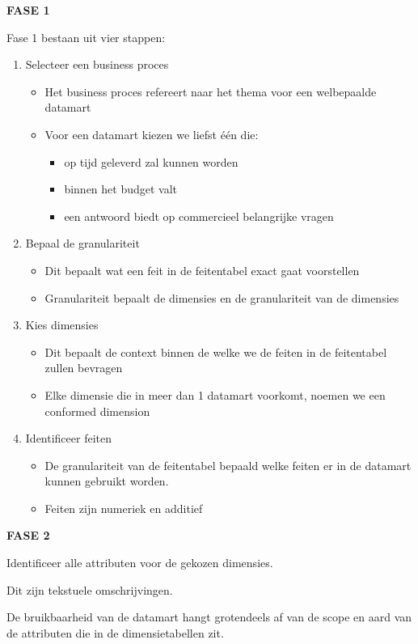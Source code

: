 \documentclass[a4paper,12pt]{article}
\begin{document}
\textbf{FASE 1}

Fase 1 bestaan uit vier stappen:
\begin{enumerate}
\item Selecteer een business proces
	\begin{itemize}
	\item Het business proces refereert naar het thema voor een welbepaalde datamart
	\item Voor een datamart kiezen we liefst één die:
		\begin{itemize}
		\item op tijd geleverd zal kunnen worden
		\item binnen het budget valt
		\item een antwoord biedt op commercieel belangrijke vragen
		\end{itemize}
	\end{itemize}
\item Bepaal de granulariteit
	\begin{itemize}
	\item Dit bepaalt wat een feit in de feitentabel exact gaat voorstellen
	\item Granulariteit bepaalt de dimensies en de granulariteit van de dimensies
	\end{itemize}
\item Kies dimensies
	\begin{itemize}
	\item Dit bepaalt de context binnen de welke we de feiten in de feitentabel zullen bevragen
	\item Elke dimensie die in meer dan 1 datamart voorkomt, noemen we een conformed dimension
	\end{itemize}
\item Identificeer feiten
	\begin{itemize}
	\item De granulariteit van de feitentabel bepaald welke feiten er in de datamart kunnen gebruikt worden.
	\item Feiten zijn numeriek en additief
	\end{itemize}
\end{enumerate}
\textbf{FASE 2}

Identificeer alle attributen voor de gekozen dimensies.

Dit zijn tekstuele omschrijvingen.

De bruikbaarheid van de datamart hangt grotendeels af van de scope en aard van de attributen die in de dimensietabellen zit.
\end{document}
